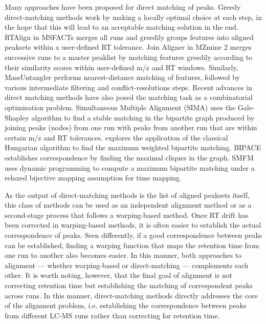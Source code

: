 Many approaches have been proposed for direct matching of peaks. Greedy direct-matching methods work by making a locally optimal choice at each step, in the hope that this will lead to an acceptable matching solution in the end. RTAlign in MSFACTs \cite{Duran2003} merges all runs and greedily groups features into aligned peaksets within a user-defined RT tolerance. Join Aligner \cite{Pluskal2010} in MZmine 2 merges successive runs to a master peaklist by matching features greedily according to their similarity scores within user-defined m/z and RT windows. Similarly, MassUntangler \cite{Ballardini2011} performs nearest-distance matching of features, followed by various intermediate filtering and conflict-resolutions steps. Recent advances in direct matching methods have also posed the matching task as a combinatorial optimisation problem. Simultaneous Multiple Alignment (SIMA) \cite{Voss2011a} uses the Gale-Shapley algorithm to find a stable matching in the bipartite graph produced by joining peaks (nodes) from one run with peaks from another run that are within certain m/z and RT tolerances. \cite{Wang2013} explores the application of the classical Hungarian algorithm to find the maximum weighted bipartite matching. BIPACE \cite{Hoffmann2012a} establishes correspondence by finding the maximal cliques in the graph. SMFM \cite{Lin2013} uses dynamic programming to compute a maximum bipartite matching under a relaxed bijective mapping assumption for time mapping.

As the output of direct-matching methods is the list of aligned peaksets itself, this class of methods can be used as an independent alignment method or as a second-stage process that follows a warping-based method. Once RT drift has been corrected in warping-based methods, it is often easier to establish the actual correspondence of peaks. Seen differently, if a good correspondence between peaks can be established, finding a warping function that maps the retention time from one run to another also becomes easier. In this manner, both approaches to alignment --- whether warping-based or direct-matching --- complements each other. It is worth noting, however, that the final goal of alignment is not correcting retention time but establishing the matching of correspondent peaks across runs. In this manner, direct-matching methods directly addresses the core of the alignment problem, i.e. establishing the correspondence between peaks from different LC-MS runs rather than correcting for retention time.

